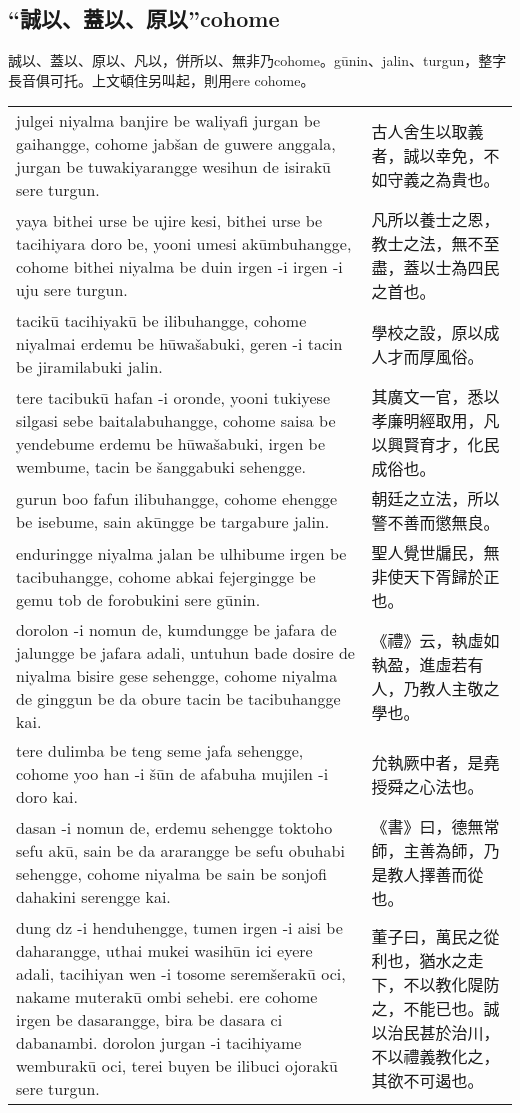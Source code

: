 \documentclass{article}
\begin{document}
\subsection{“誠以、蓋以、原以”cohome}
\noindent 誠以、蓋以、原以、凡以，併所以、無非乃cohome。g\={u}nin、jalin、turgun，整字長音俱可托。上文頓住另叫起，則用ere cohome。
\begin{center}
    \begin{tabularx}{\textwidth}{XX}
        julgei niyalma banjire be waliyafi jurgan be gaihangge, cohome jab\v{s}an de guwere anggala, jurgan be tuwakiyarangge wesihun de isirak\={u} sere turgun. & 古人舍生以取義者，誠以幸免，不如守義之為貴也。\\
        yaya bithei urse be ujire kesi, bithei urse be tacihiyara doro be, yooni umesi ak\={u}mbuhangge, cohome bithei niyalma be duin irgen -i irgen -i uju sere turgun. & 凡所以養士之恩，教士之法，無不至盡，蓋以士為四民之首也。\\
        tacik\={u} tacihiyak\={u} be ilibuhangge, cohome niyalmai erdemu be h\={u}wa\v{s}abuki, geren -i tacin be jiramilabuki jalin. & 學校之設，原以成人才而厚風俗。\\
        tere tacibuk\={u} hafan -i oronde, yooni tukiyese silgasi sebe baitalabuhangge, cohome saisa be yendebume erdemu be h\={u}wa\v{s}abuki, irgen be wembume, tacin be \v{s}anggabuki sehengge. & 其廣文一官，悉以孝廉明經取用，凡以興賢育才，化民成俗也。\\
        gurun boo fafun ilibuhangge, cohome ehengge be isebume, sain ak\={u}ngge be targabure jalin. & 朝廷之立法，所以警不善而懲無良。\\
        enduringge niyalma jalan be ulhibume irgen be tacibuhangge, cohome abkai fejergingge be gemu tob de forobukini sere g\={u}nin. & 聖人覺世牖民，無非使天下胥歸於正也。\\
        dorolon -i nomun de, kumdungge be jafara de jalungge be jafara adali, untuhun bade dosire de niyalma bisire gese sehengge, cohome niyalma de ginggun be da obure tacin be tacibuhangge kai. & 《禮》云，執虛如執盈，進虛若有人，乃教人主敬之學也。\\
        tere dulimba be teng seme jafa sehengge, cohome yoo han -i \v{s}\={u}n de afabuha mujilen -i doro kai. & 允執厥中者，是堯授舜之心法也。\\
        dasan -i nomun de, erdemu sehengge toktoho sefu ak\={u}, sain be da ararangge be sefu obuhabi sehengge, cohome niyalma be sain be sonjofi dahakini serengge kai. & 《書》曰，德無常師，主善為師，乃是教人擇善而從也。\\
        dung dz -i henduhengge, tumen irgen -i aisi be daharangge, uthai mukei wasih\={u}n ici eyere adali, tacihiyan wen -i tosome serem\v{s}erak\={u} oci, nakame muterak\={u} ombi sehebi. ere cohome irgen be dasarangge, bira be dasara ci dabanambi. dorolon jurgan -i tacihiyame wemburak\={u} oci, terei buyen be ilibuci ojorak\={u} sere turgun. & 董子曰，萬民之從利也，猶水之走下，不以教化隄防之，不能已也。誠以治民甚於治川，不以禮義教化之，其欲不可遏也。
    \end{tabularx}
\end{center}
\end{document}
